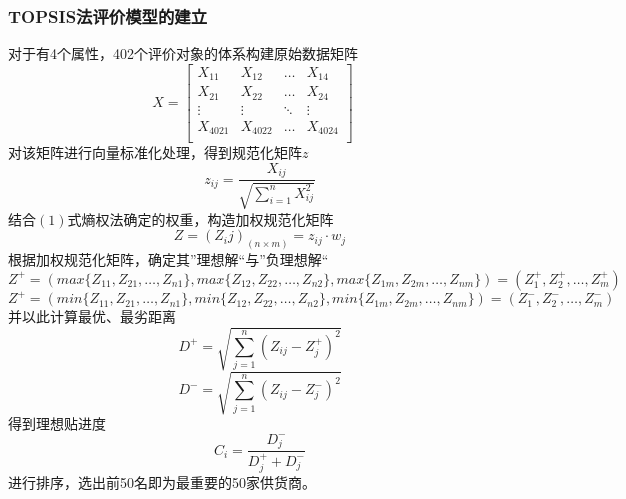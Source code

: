 \documentclass{cumcmthesis}
\begin{document}
\subsubsection*{TOPSIS法评价模型的建立}
对于有4个属性，402个评价对象的体系构建原始数据矩阵
\begin{equation}
    X=\begin{bmatrix} 
        X_{11}&X_{12}&\dots&X_{14}\\
        X_{21}&X_{22}&\dots&X_{24}\\
        \vdots&\vdots&\ddots&\vdots\\
        X_{4021}&X_{4022}&\dots&X_{4024}\\ 
        \end{bmatrix} \quad
        \nonumber
    \label{数据矩阵}
    \end{equation}
对该矩阵进行向量标准化处理，得到规范化矩阵$z$
\begin{equation}
    z_{ij}=\frac{X_{ij}}{\sqrt{\sum\limits^n_{i=1}X^2_{ij}}}\nonumber
    \label{规范化矩阵}
    \end{equation}
结合$(1)$式熵权法确定的权重，构造加权规范化矩阵
\begin{equation}
    Z=(Z_ij)_{(n\times m)}=z_{ij}\cdot w_j\nonumber
    \label{加权规范化矩阵}
    \end{equation}
根据加权规范化矩阵，确定其”理想解“与”负理想解“
\begin{equation}
    Z^+ = (max\{Z_{11},Z{_21},\dots,Z_{n1}\},max\{Z_{12},Z_{22},\dots,Z_{n2}\},max\{Z_{1m},Z_{2m},\dots,Z_{nm}\}) =(Z^+_1,Z^+_2,\dots,Z^+_m)\nonumber
    \end{equation}
\begin{equation}
    Z^+ = (min\{Z_{11},Z{_21},\dots,Z_{n1}\},min\{Z_{12},Z_{22},\dots,Z_{n2}\},min\{Z_{1m},Z_{2m},\dots,Z_{nm}\}) =(Z^-_1,Z^-_2,\dots,Z^-_m)\nonumber
    \end{equation}
并以此计算最优、最劣距离
\begin{equation}
    D^+=\sqrt{\sum_{j=1}^{n}{(Z_{ij}-Z^+_j)^2}}\nonumber
    \end{equation}
\begin{equation}
    D^-=\sqrt{\sum_{j=1}^{n}{(Z_{ij}-Z^-_j)^2}}\nonumber
    \end{equation}
得到理想贴进度
\begin{equation}
    C_i=\frac{D^-_j}{D^+_j+D^-_j}\nonumber
    \end{equation}
进行排序，选出前50名即为最重要的50家供货商。
\end{document}
